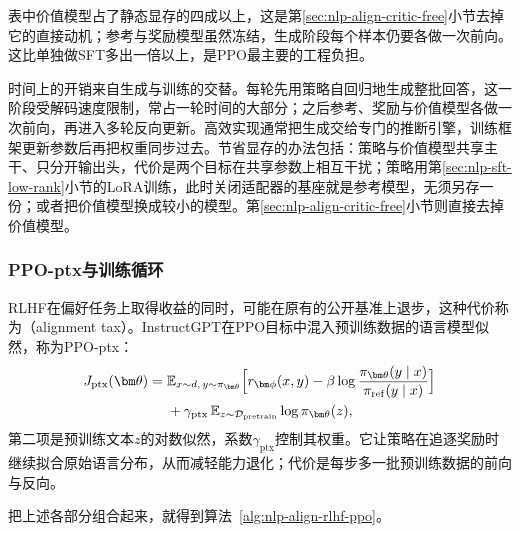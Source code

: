 表中价值模型占了静态显存的四成以上，这是第\ref{sec:nlp-align-critic-free}小节去掉它的直接动机；参考与奖励模型虽然冻结，生成阶段每个样本仍要各做一次前向。这比单独做SFT多出一倍以上，是PPO最主要的工程负担。

时间上的开销来自生成与训练的交替。每轮先用策略自回归地生成整批回答，这一阶段受解码速度限制，常占一轮时间的大部分；之后参考、奖励与价值模型各做一次前向，再进入多轮反向更新。高效实现通常把生成交给专门的推断引擎，训练框架更新参数后再把权重同步过去。节省显存的办法包括：策略与价值模型共享主干、只分开输出头，代价是两个目标在共享参数上相互干扰；策略用第\ref{sec:nlp-sft-low-rank}小节的LoRA训练，此时关闭适配器的基座就是参考模型，无须另存一份；或者把价值模型换成较小的模型。第\ref{sec:nlp-align-critic-free}小节则直接去掉价值模型。

\subsubsection{PPO-ptx与训练循环}
\label{sec:nlp-align-ppo-loop}

RLHF在偏好任务上取得收益的同时，可能在原有的公开基准上退步，这种代价称为（alignment tax）。InstructGPT在PPO目标中混入预训练数据的语言模型似然，称为PPO-ptx\cite{ouyang2022instructgpt}：
\begin{equation}
\label{eq:nlp-align-ppo-ptx}
\begin{aligned}
 J_{\mathrm{ptx}}(\bm\theta)={}&
 \mathbb E_{x\sim d,\,y\sim\pi_{\bm\theta}}\Bigl[r_{\bm\phi}(x,y)-\beta\log\frac{\pi_{\bm\theta}(y\mid x)}{\pi_{\mathrm{ref}}(y\mid x)}\Bigr]\\
 &+\gamma_{\mathrm{ptx}}\,\mathbb E_{z\sim\mathcal D_{\mathrm{pretrain}}}\log\pi_{\bm\theta}(z),
\end{aligned}
\end{equation}
第二项是预训练文本$z$的对数似然，系数$\gamma_{\mathrm{ptx}}$控制其权重。它让策略在追逐奖励时继续拟合原始语言分布，从而减轻能力退化；代价是每步多一批预训练数据的前向与反向。

把上述各部分组合起来，就得到算法~\ref{alg:nlp-align-rlhf-ppo}。

